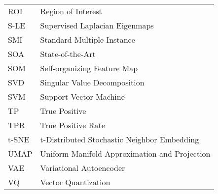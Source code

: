 \begin{longtable}{l p{5in}}
ROI & Region of Interest\\
S-LE & Supervised Laplacian Eigenmaps\\
SMI& Standard Multiple Instance\\
SOA & State-of-the-Art\\
SOM & Self-organizing Feature Map\\
SVD & Singular Value Decomposition\\
SVM & Support Vector Machine\\
TP & True Positive\\
TPR & True Positive Rate\\
t-SNE & t-Distributed Stochastic Neighbor Embedding\\
UMAP & Uniform Manifold Approximation and Projection\\
VAE & Variational Autoencoder\\
VQ & Vector Quantization\\

 \end{longtable}



\doublespacing

